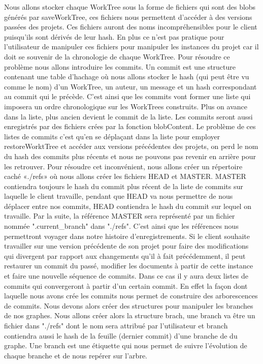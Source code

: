 \documentclass[11pt,francais]{article}
\begin{document}
	Nous allons stocker chaque WorkTree sous la forme de fichiers qui sont des blobs générés par saveWorkTree, ces fichiers nous permettent d’accéder à des versions passées des projets. Ces fichiers auront des noms incompréhensibles pour le client puisqu’ils sont dérivés de leur hash. En plus ce n’est pas pratique pour l’utilisateur de manipuler ces fichiers pour manipuler les instances du projet car il doit se souvenir de la chronologie de chaque WorkTree. \newline
	Pour résoudre ce problème nous allons introduire les commits. Un commit est une structure contenant une table d’hachage où nous allons stocker le hash (qui peut être vu comme le nom) d’un WorkTree, un auteur, un message et un hash correspondant au commit qui le précède. C’est ainsi que les commits vont former une liste qui imposera un ordre chronologique sur les WorkTrees construits. Plus on avance dans la liste, plus ancien devient le commit de la liste. Les commits seront aussi enregistrés par des fichiers crées par la fonction blobContent. \newline
	Le problème de ces listes de commits c’est qu’en se déplaçant dans la liste pour employer restoreWorktTree et accéder aux versions précédentes des projets, on perd le nom du hash des commits plus récents et nous ne pouvons pas revenir en arrière pour les retrouver. Pour résoudre cet inconvénient, nous allons créer un répertoire caché «./refs» où nous allons créer les fichiers HEAD et MASTER. MASTER contiendra toujours le hash du commit plus récent de la liste de commits sur laquelle le client travaille, pendant que HEAD va nous permettre de nous déplacer entre nos commits, HEAD contiendra le hash du commit sur lequel on travaille. Par la suite, la référence MASTER sera représenté par un fichier nommée ".current\_branch" dans "./refs". \newline \newline
	C’est ainsi que les références nous permettront voyager dans notre histoire d’enregistrements.  Si le client souhaite travailler sur une version précédente de son projet pour faire des modifications qui divergent par rapport aux changements qu’il à fait précédemment, il peut restaurer un commit du passé, modifier les documents à partir de cette instance et faire une nouvelle séquence de commits. Dans ce cas il y aura deux listes de commits qui convergeront à partir d’un certain commit. En effet la façon dont laquelle nous avons crée les commits nous permet de construire des arborescences de commits. Nous devons alors créer des structures pour manipuler les branches de nos graphes. Nous allons créer alors la structure brach, une branch va être un fichier dans "./refs" dont le nom sera attribué par l’utilisateur et branch contiendra  aussi le hash de la feuille (dernier commit) d’une branche de du graphe. Une branch est une étiquette qui nous permet de suivre l’évolution de chaque branche et de nous repérer sur l'arbre.
\end{document}
